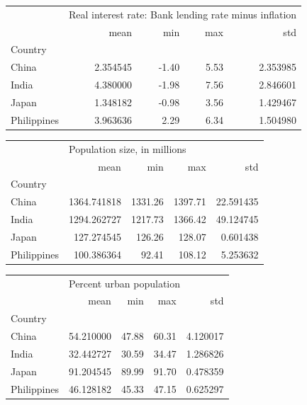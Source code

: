 \documentclass[11pt]{article}
\begin{document}
\begin{flushleft}
\begin{tabular}{lrrrr}
\toprule
{} & \multicolumn{4}{l}{Real interest rate: Bank lending rate minus inflation} \\
{} &                                                  mean &   min &   max &       std \\
Country     &                                                       &       &       &           \\
\midrule
China       &                                           2.354545 & -1.40 &  5.53 &  2.353985 \\
India       &                                           4.380000 & -1.98 &  7.56 &  2.846601 \\
Japan       &                                           1.348182 & -0.98 &  3.56 &  1.429467 \\
Philippines &                                           3.963636 &  2.29 &  6.34 &  1.504980 \\
\bottomrule
\end{tabular}

\vspace{2em}

\begin{tabular}{lrrrr}
\toprule
{} & \multicolumn{4}{l}{Population size, in millions} \\
{} &                         mean &      min &      max &        std \\
Country     &                              &          &          &            \\
\midrule
China       &                  1364.741818 &  1331.26 &  1397.71 &  22.591435 \\
India       &                  1294.262727 &  1217.73 &  1366.42 &  49.124745 \\
Japan       &                   127.274545 &   126.26 &   128.07 &   0.601438 \\
Philippines &                   100.386364 &    92.41 &   108.12 &   5.253632 \\
\bottomrule
\end{tabular}

\vspace{2em}

\begin{tabular}{lrrrr}
\toprule
{} & \multicolumn{4}{l}{Percent urban population} \\
{} &                     mean &    min &    max &       std \\
Country     &                          &        &        &           \\
\midrule
China       &                54.210000 &  47.88 &  60.31 &  4.120017 \\
India       &                32.442727 &  30.59 &  34.47 &  1.286826 \\
Japan       &                91.204545 &  89.99 &  91.70 &  0.478359 \\
Philippines &                46.128182 &  45.33 &  47.15 &  0.625297 \\
\bottomrule
\end{tabular}


\end{flushleft}
\end{document}
